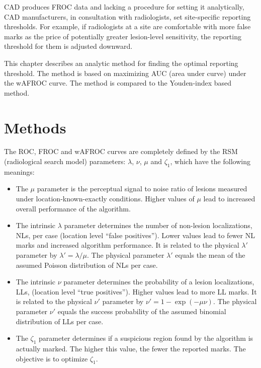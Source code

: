 \documentclass[
]{book}
\begin{document}
CAD produces FROC data and lacking a procedure for setting it analytically, CAD manufacturers, in consultation with radiologists, set site-specific reporting thresholds. For example, if radiologists at a site are comfortable with more false marks as the price of potentially greater lesion-level sensitivity, the reporting threshold for them is adjusted downward.

This chapter describes an analytic method for finding the optimal reporting threshold. The method is based on maximizing AUC (area under curve) under the wAFROC curve. The method is compared to the Youden-index based method.

\hypertarget{optim-op-point-methods}{%
\section{Methods}\label{optim-op-point-methods}}

The ROC, FROC and wAFROC curves are completely defined by the RSM (radiological search model) parameters: \(\lambda\), \(\nu\), \(\mu\) and \(\zeta_1\), which have the following meanings:

\begin{itemize}
\item
  The \(\mu\) parameter is the perceptual signal to noise ratio of lesions measured under location-known-exactly conditions. Higher values of \(\mu\) lead to increased overall performance of the algorithm.
\item
  The intrinsic \(\lambda\) parameter determines the number of non-lesion localizations, NLs, per case (location level ``false positives''). Lower values lead to fewer NL marks and increased algorithm performance. It is related to the physical \(\lambda'\) parameter by \(\lambda' = \lambda/\mu\). The physical parameter \(\lambda'\) equals the mean of the assumed Poisson distribution of NLs per case.
\item
  The intrinsic \(\nu\) parameter determines the probability of a lesion localizations, LLs, (location level ``true positives''). Higher values lead to more LL marks. It is related to the physical \(\nu'\) parameter by \(\nu' = 1 - \exp(-\mu \nu)\). The physical parameter \(\nu'\) equals the success probability of the assumed binomial distribution of LLs per case.
\item
  The \(\zeta_1\) parameter determines if a suspicious region found by the algorithm is actually marked. The higher this value, the fewer the reported marks. The objective is to optimize \(\zeta_1\).
\end{itemize}
\end{document}
